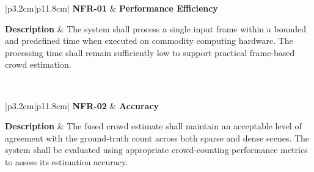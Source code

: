
\begin{table}[H]
	\centering
	\renewcommand{\arraystretch}{1.25}
	\begin{tabular}{|p{3.2cm}|p{11.8cm}|}
		\hline
		\textbf{NFR-01} &
		\textbf{Performance Efficiency} \\ \hline
		
		\textbf{Description} &
		The system shall process a single input frame within a bounded and predefined time when executed on commodity computing hardware. The processing time shall remain sufficiently low to support practical frame-based crowd estimation. \\ \hline
		
		 \\ \hline
	\end{tabular}
	\caption{Non-functional requirement for performance efficiency.}
	\label{tab:nfr01}
\end{table}



\begin{table}[H]
	\centering
	\renewcommand{\arraystretch}{1.25}
	\begin{tabular}{|p{3.2cm}|p{11.8cm}|}
		\hline
		\textbf{NFR-02} &
		\textbf{Accuracy} \\ \hline
		
		\textbf{Description} &
		The fused crowd estimate shall maintain an acceptable level of agreement with the ground-truth count across both sparse and dense scenes. The system shall be evaluated using appropriate crowd-counting performance metrics to assess its estimation accuracy. \\ \hline
		
		 \\ \hline
	\end{tabular}
	\caption{Non-functional requirement for crowd-counting accuracy.}
	\label{tab:nfr02}
\end{table}


